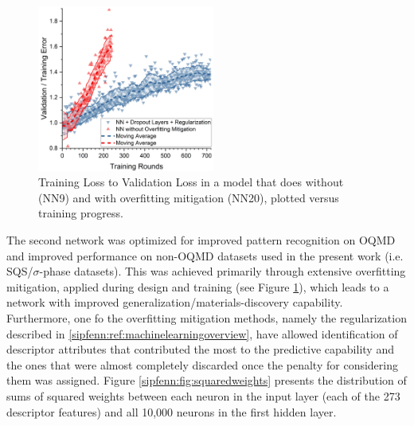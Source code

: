 \begin{figure}[H]
    \centering
    \includegraphics[width=0.52\textwidth]{sipfenn/validationtotraining_generalized.png}
    \caption{Training Loss to Validation Loss in a model that does without (NN9) and with overfitting mitigation (NN20), plotted versus training progress.}
    \label{sipfenn:fig:trainingvalidation-body}
\end{figure}

The second network was optimized for improved pattern recognition on OQMD and improved performance on non-OQMD datasets used in the present work (i.e. SQS/$\sigma$-phase datasets). This was achieved primarily through extensive overfitting mitigation, applied during design and training (see Figure \ref{sipfenn:fig:trainingvalidation-body}), which leads to a network with improved generalization/materials-discovery capability. Furthermore, one fo the overfitting mitigation methods, namely the regularization described in \ref{sipfenn:ref:machinelearningoverview}, have allowed identification of descriptor attributes that contributed the most to the predictive capability and the ones that were almost completely discarded once the penalty for considering them was assigned. Figure \ref{sipfenn:fig:squaredweights} presents the distribution of sums of squared weights between each neuron in the input layer (each of the 273 descriptor features) and all 10,000 neurons in the first hidden layer. 

